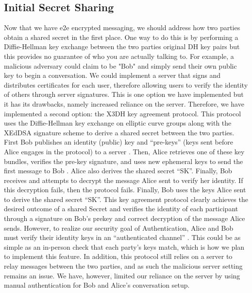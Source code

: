 \documentclass[conference]{IEEEtran}
\begin{document}
\subsection{Initial Secret Sharing}
Now that we have e2e encrypted messaging, we should address how two parties obtain a shared secret in the first place. One way to do this is by performing a Diffie-Hellman key exchange between the two parties original DH key pairs but this provides no guarantee of who you are actually talking to. For example, a malicious adversary could claim to be "Bob" and simply send their own public key to begin a conversation. We could implement a server that signs and distributes certificates for each user, therefore allowing users to verify the identity of others through server signatures. This is one option we have implemented but it has its drawbacks, namely increased reliance on the server. Therefore, we have implemented a second option: the X3DH key agreement protocol. This protocol uses the Diffie-Hellman key exchange on elliptic curve groups along with the XEdDSA signature scheme to derive a shared secret between the two parties. First Bob publishes an identity (public) key and “pre-keys” (keys sent before Alice engages in the protocol) to a server \cite{https://signal.org/docs/specifications/x3dh/}. Then, Alice retrieves one of these key bundles, verifies the pre-key signature, and uses new ephemeral keys to send the first message to Bob \cite{https://signal.org/docs/specifications/x3dh/}. Alice also derives the shared secret “SK”.  Finally, Bob receives and attempts to decrypt the message Alice sent to verify her identity. If this decryption fails, then the protocol fails. Finally, Bob uses the keys Alice sent to derive the shared secret “SK”. This key agreement protocol clearly achieves the desired outcome of a shared Secret and verifies the identity of each participant through a signature on Bob’s prekey and correct decryption of the message Alice sends. However, to realize our security goal of Authentication, Alice and Bob must verify their identity keys in an “authenticated channel” \cite{https://signal.org/docs/specifications/x3dh/}. This could be as simple as an in-person check that each party's keys match, which is how we plan to implement this feature. In addition, this protocol still relies on a server to relay messages between the two parties, and as such the malicious server setting remains an issue. We have, however, limited our reliance on the server by using manual authentication for Bob and Alice’s conversation setup.
\end{document}
